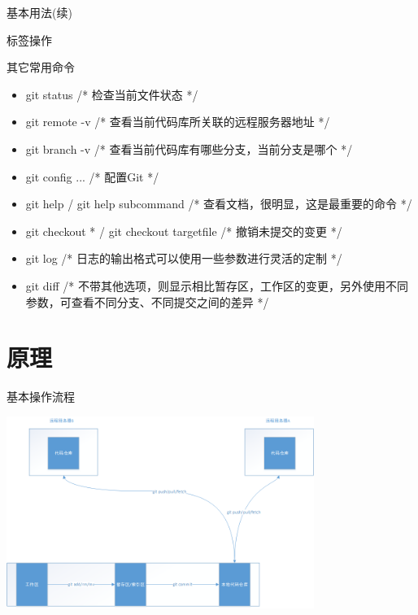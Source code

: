 \documentclass[CJK, 10pt]{beamer}
\begin{document}
\begin{CJK*}{UTF8}{gbsn}
\begin{frame}{基本用法(续)}
\begin{block}{标签操作}
\begin{itemize}
        \end{itemize}
    \end{block}
    \begin{block}{其它常用命令}
        \begin{itemize}
            \item git status /* 检查当前文件状态 */
            \item git remote -v /* 查看当前代码库所关联的远程服务器地址 */
            \item git branch -v /* 查看当前代码库有哪些分支，当前分支是哪个 */
            \item git config ... /* 配置Git */
            \item git help / git help subcommand /* 查看文档，很明显，这是最重要的命令 */
            \item git checkout * / git checkout targetfile /* 撤销未提交的变更 */
            \item git log /* 日志的输出格式可以使用一些参数进行灵活的定制 */
            \item git diff /* 不带其他选项，则显示相比暂存区，工作区的变更，另外使用不同参数，可查看不同分支、不同提交之间的差异 */
        \end{itemize}
    \end{block}
\end{frame}

\section{原理}
\begin{frame}{基本操作流程}
    \begin{center}
        \includegraphics[width=10cm]{git-basic-process.png}
    \end{center}
\end{frame}


\end{CJK*}
\end{document}
